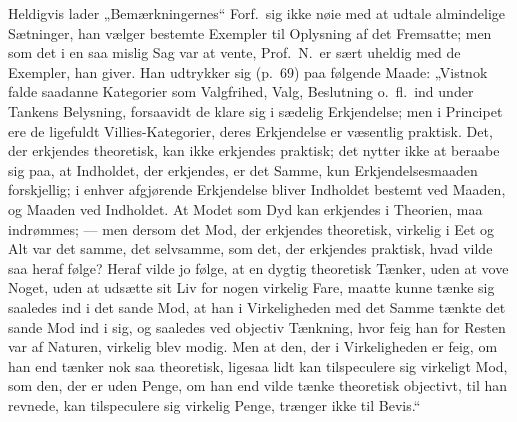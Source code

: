 Heldigvis lader „Bemærkningernes“ Forf.\ sig ikke
nøie med at udtale almindelige Sætninger, han vælger bestemte
Exempler til Oplysning af det Fremsatte; men som det i en saa mislig Sag var at
vente, Prof.\ N.\ er sært uheldig med de Exempler, han giver. Han udtrykker sig
(p.\ 69) paa følgende Maade: „Vistnok falde saadanne Kategorier som Valgfrihed,
Valg, Beslutning o.\ fl.\ ind under Tankens Belysning, forsaavidt de klare sig
i sædelig Erkjendelse; men i Principet ere de ligefuldt Villies-Kategorier,
deres Erkjendelse er væsentlig praktisk. Det, der erkjendes theoretisk, kan
ikke erkjendes praktisk; det nytter ikke at beraabe sig paa, at Indholdet, der
erkjendes, er det Samme, kun Erkjendelsesmaaden forskjellig; i enhver
afgjørende Erkjendelse bliver Indholdet bestemt ved Maaden, og Maaden ved
Indholdet. At Modet som Dyd kan erkjendes i Theorien, maa indrømmes; --- men
dersom det Mod, der erkjendes theoretisk, virkelig i Eet og Alt var det samme,
det selvsamme, som det, der erkjendes praktisk, hvad vilde saa heraf følge?
Heraf vilde jo følge, at en dygtig theoretisk Tænker, uden at vove Noget, uden
at udsætte sit Liv for nogen virkelig Fare, maatte kunne tænke sig saaledes ind
i det sande Mod, at han i Virkeligheden med det Samme tænkte det sande Mod ind
i sig, og saaledes ved objectiv Tænkning, hvor feig han for Resten var af
Naturen, virkelig blev modig. Men at den, der i Virkeligheden er feig, om han
end tænker nok saa theoretisk, ligesaa lidt kan tilspeculere sig virkeligt Mod,
som den, der er uden Penge, om han
end vilde tænke theoretisk objectivt, til han revnede, kan
tilspeculere sig virkelig Penge, trænger ikke til Bevis.“

